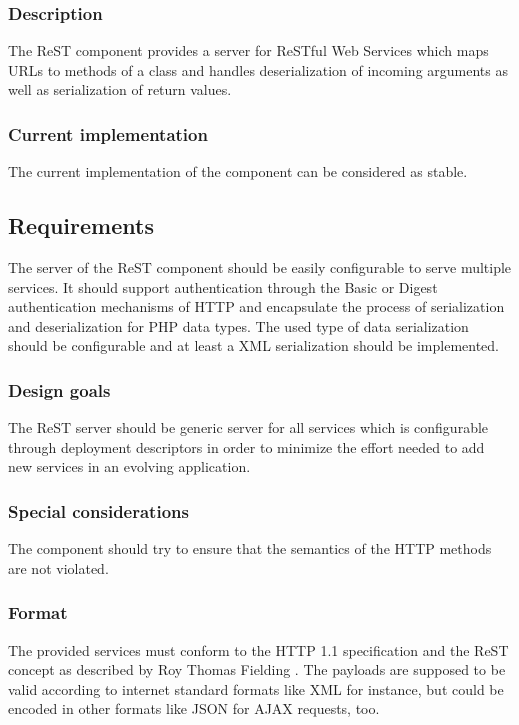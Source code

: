 \documentclass[10pt,final,a4paper,oneside]{article}
\begin{document}
\subsubsection{Description}
The ReST component provides a server for
ReSTful Web Services which maps URLs
to methods of a class and handles
deserialization of incoming arguments
as well as serialization of return values.


\subsubsection{Current implementation}
The current implementation of the component
can be considered as stable.

\subsection{Requirements}\label{subsec:ReSTRequirements}
The server of the ReST component 
should be easily configurable to serve multiple services.
It should support authentication through
the Basic or Digest authentication mechanisms of HTTP \cite{RFC2617}
and encapsulate the process of serialization and deserialization
for PHP data types. The used type of data serialization should be configurable
and at least a XML serialization should be implemented.

\subsubsection{Design goals}
The ReST server should be generic server for all services
which is configurable through deployment descriptors
in order to minimize the effort needed to add
new services in an evolving application.

\subsubsection{Special considerations}
The component should try to ensure that the
semantics of the HTTP methods
are not violated.

\subsubsection{Format}
The provided services must conform to the
HTTP 1.1 specification and the ReST concept
as described by Roy Thomas Fielding \cite{ReSTpaper}.
The payloads are supposed to be valid according to 
internet standard formats like XML \cite{XML} for instance, 
but could be encoded in other formats like JSON for AJAX requests, too.
\end{document}

